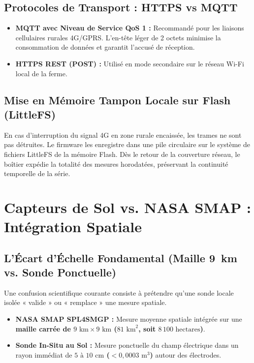 \documentclass[11pt,a4paper,oneside]{report}
\begin{document}
\section{Protocoles de Transport : HTTPS vs MQTT}
\begin{itemize}[leftmargin=*]
    \item \textbf{MQTT avec Niveau de Service QoS 1 :} Recommandé pour les liaisons cellulaires rurales 4G/GPRS. L'en-tête léger de 2 octets minimise la consommation de données et garantit l'accusé de réception.
    \item \textbf{HTTPS REST (POST) :} Utilisé en mode secondaire sur le réseau Wi-Fi local de la ferme.
\end{itemize}

\section{Mise en Mémoire Tampon Locale sur Flash (LittleFS)}
En cas d'interruption du signal 4G en zone rurale encaissée, les trames ne sont pas détruites. Le firmware les enregistre dans une pile circulaire sur le système de fichiers LittleFS de la mémoire Flash. Dès le retour de la couverture réseau, le boîtier expédie la totalité des mesures horodatées, préservant la continuité temporelle de la série.

\chapter{Capteurs de Sol vs. NASA SMAP : Intégration Spatiale}

\section{L'Écart d'Échelle Fondamental (Maille 9~km vs. Sonde Ponctuelle)}
Une confusion scientifique courante consiste à prétendre qu'une sonde locale isolée « valide » ou « remplace » une mesure spatiale.
\begin{itemize}[leftmargin=*]
    \item \textbf{NASA SMAP SPL4SMGP :} Mesure moyenne spatiale intégrée sur une \textbf{maille carrée de $9\text{ km} \times 9\text{ km}$ ($81\text{ km}^2$, soit $8\,100\text{ hectares}$)}.
    \item \textbf{Sonde In-Situ au Sol :} Mesure ponctuelle du champ électrique dans un rayon immédiat de \textbf{$5\text{ à }10\text{ cm}$ ($< 0,0003\text{ m}^3$)} autour des électrodes.
\end{itemize}
\end{document}
